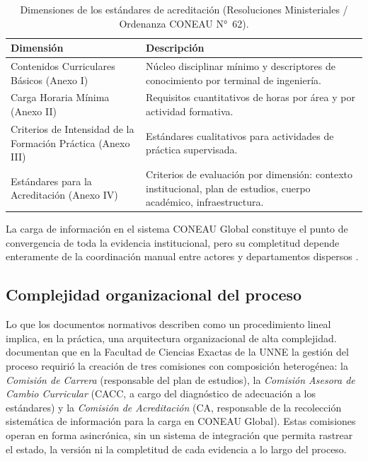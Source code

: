 \begin{table}[H]
  \centering
  \caption{Dimensiones de los estándares de acreditación (Resoluciones Ministeriales / Ordenanza CONEAU N°~62).}
  \label{tab:dimensiones_acreditacion}
  \begin{tabularx}{\textwidth}{lX}
    \toprule
    \textbf{Dimensión} & \textbf{Descripción} \\
    \midrule
    Contenidos Curriculares Básicos (Anexo I)    & Núcleo disciplinar mínimo y descriptores de conocimiento por terminal de ingeniería. \\
    Carga Horaria Mínima (Anexo II)              & Requisitos cuantitativos de horas por área y por actividad formativa. \\
    Criterios de Intensidad de la Formación Práctica (Anexo III) & Estándares cualitativos para actividades de práctica supervisada. \\
    Estándares para la Acreditación (Anexo IV)  & Criterios de evaluación por dimensión: contexto institucional, plan de estudios, cuerpo académico, infraestructura. \\
    \bottomrule
  \end{tabularx}
\end{table}

La carga de información en el sistema CONEAU Global constituye el punto de convergencia de toda la evidencia institucional, pero su completitud depende enteramente de la coordinación manual entre actores y departamentos dispersos \citep{greiner2023plan}.

\subsection{Complejidad organizacional del proceso}

Lo que los documentos normativos describen como un procedimiento lineal implica, en la práctica, una arquitectura organizacional de alta complejidad. \citet{greiner2023plan} documentan que en la Facultad de Ciencias Exactas de la UNNE la gestión del proceso requirió la creación de tres comisiones con composición heterogénea: la \textit{Comisión de Carrera} (responsable del plan de estudios), la \textit{Comisión Asesora de Cambio Curricular} (CACC, a cargo del diagnóstico de adecuación a los estándares) y la \textit{Comisión de Acreditación} (CA, responsable de la recolección sistemática de información para la carga en CONEAU Global). Estas comisiones operan en forma asincrónica, sin un sistema de integración que permita rastrear el estado, la versión ni la completitud de cada evidencia a lo largo del proceso.

